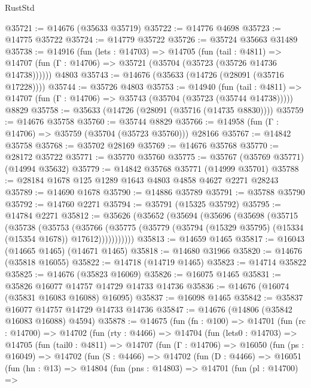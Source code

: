 \begin{lexlean}{RustStd}
\begin{coremodule}
@35721 := @14676 (@35633 @35719)
@35722 := @14776 @4698
@35723 := @14775 @35722
@35724 := @14779 @35722
@35726 := @35724 @35663 @31489
@35738 := @14916
    (fun (lets : @14703) =>
    @14705
      (fun (tail : @4811) =>
      @14707 (fun (Γ : @14706) => @35721 (@35704 (@35723 (@35726 @14736 @14738))))))
    @4803
@35743 := @14676 (@35633 (@14726 (@28091 (@35716 @17228))))
@35744 := @35726 @4803
@35753 := @14940
    (fun (tail : @4811) => @14707 (fun (Γ : @14706) => @35743 (@35704 (@35723 (@35744 @14738)))))
    @8829
@35758 := @35633 (@14726 (@28091 (@35716 (@14735 @8830))))
@35759 := @14676 @35758
@35760 := @35744 @8829
@35766 := @14958 (fun (Γ : @14706) => @35759 (@35704 (@35723 @35760))) @28166
@35767 := @14842 @35758
@35768 := @35702 @28169
@35769 := @14676 @35768
@35770 := @28172 @35722
@35771 := @35770 @35760
@35775 := @35767 (@35769 @35771) (@14994 @35632)
@35779 := @14842 @35768 @35771 (@14999 @35701)
@35788 := @28184 @1678 @125 @1289 @1643 @4803 @4858 @4627 @2271 @28243
@35789 := @14690 @1678
@35790 := @14886 @35789
@35791 := @35788 @35790
@35792 := @14760 @2271
@35794 := @35791 (@15325 @35792)
@35795 := @14784 @2271
@35812 := @35626
    (@35652
      (@35694
        (@35696
          (@35698
            (@35715
              (@35738
                (@35753
                  (@35766
                    (@35775
                      (@35779 (@35794 (@15329 @35795) (@15334 (@15354 @1678)) @17612)))))))))))
@35813 := @14659 @1465
@35817 := @16043 (@14665 @1465) (@14671 @1465)
@35818 := @14680 @31966
@35820 := @14676 (@35818 @16055)
@35822 := @14718 (@14719 @1465)
@35823 := @14714 @35822
@35825 := @14676 (@35823 @16069)
@35826 := @16075 @1465
@35831 := @35826 @16077 @14757 @14729 @14733 @14736
@35836 := @14676 (@16074 (@35831 @16083 @16088) @16095)
@35837 := @16098 @1465
@35842 := @35837 @16077 @14757 @14729 @14733 @14736
@35847 := @14676 (@14806 (@35842 @16083 @16088) @4594)
@35878 := @14675
    (fun (fn : @100) =>
    @14701
      (fun (rc : @14700) =>
      @14702
        (fun (rty : @4466) =>
        @14704
          (fun (lets0 : @14703) =>
          @14705
            (fun (tail0 : @4811) =>
            @14707
              (fun (Γ : @14706) =>
              @16050
                (fun (ps : @16049) =>
                @14702
                  (fun (S : @4466) =>
                  @14702
                    (fun (D : @4466) =>
                    @16051
                      (fun (hn : @13) =>
                      @14804
                        (fun (pns : @14803) =>
                        @14701
                          (fun (pl : @14700) =>

\end{coremodule}
\end{lexlean}
